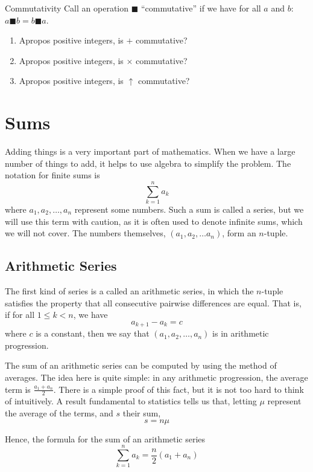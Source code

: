 \documentclass[12pt,a4paper]{report}
\begin{document}
\begin{problem}{Commutativity}
 Call an operation $\blacksquare$ ``commutative'' if we have for all $a$ and
 $b$: $a \blacksquare b = b \blacksquare a$.

 \begin{enumerate}[\hspace{.5cm}a.]
  \item Apropos positive integers, is $+$ commutative?
  \item Apropos positive integers, is $\times$ commutative?
  \item Apropos positive integers, is $\uparrow$ commutative?
 \end{enumerate}
\end{problem}

\chapter{Sums}

Adding things is a very important part of mathematics. When we have a large
number of things to add, it helps to use algebra to simplify the problem. The
notation for finite sums is \[
 \sum_{k = 1}^n a_k
\] where $a_1, a_2, \dots, a_n$ represent some numbers. Such a sum is called a
series, but we will use this term with caution, as it is often used to denote
infinite sums, which we will not cover. The numbers themselves, $(a_1, a_2,
\dots a_n)$, form an $n$-tuple.

\section{Arithmetic Series}

The first kind of series is a called an arithmetic series, in which the
$n$-tuple satisfies the property that all consecutive pairwise differences are
equal. That is, if for all $1 \le k < n$, we have \[ a_{k+1} - a_k = c \] where
$c$ is a constant, then we say that $(a_1, a_2, \dots, a_n)$ is in arithmetic
progression.

The sum of an arithmetic series can be computed by using the method of averages.
The idea here is quite simple: in any arithmetic progression, the average term
is $\frac{a_1 + a_n}{2}$. There is a simple proof of this fact, but it is not
too hard to think of intuitively. A result fundamental to statistics tells us
that, letting $\mu$ represent the average of the terms, and $s$ their sum, \[
 s = n \mu
\]

Hence, the formula for the sum of an arithmetic series \begin{equation}
 \sum_{k=1}^n a_k = \frac{n}{2} (a_1 + a_n)
\end{equation}
\end{document}
